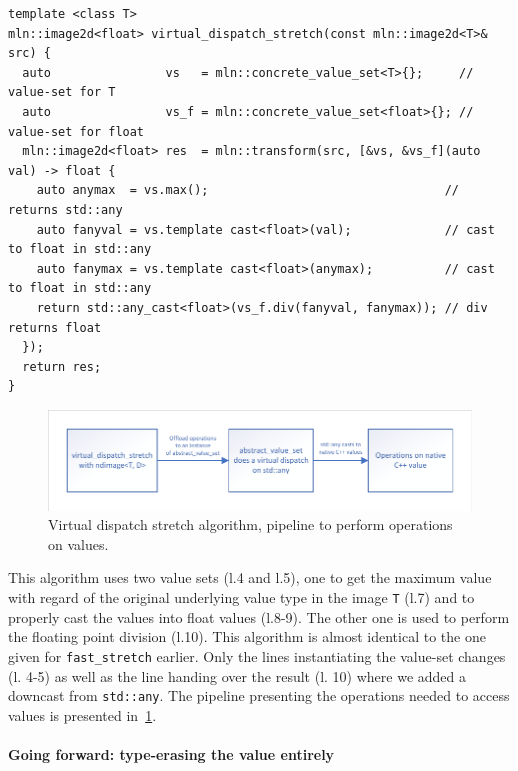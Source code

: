 \begin{verbatim}
template <class T>
mln::image2d<float> virtual_dispatch_stretch(const mln::image2d<T>& src) {
  auto                vs   = mln::concrete_value_set<T>{};     // value-set for T
  auto                vs_f = mln::concrete_value_set<float>{}; // value-set for float
  mln::image2d<float> res  = mln::transform(src, [&vs, &vs_f](auto val) -> float {
    auto anymax  = vs.max();                                 // returns std::any
    auto fanyval = vs.template cast<float>(val);             // cast to float in std::any
    auto fanymax = vs.template cast<float>(anymax);          // cast to float in std::any
    return std::any_cast<float>(vs_f.div(fanyval, fanymax)); // div returns float
  });
  return res;
}
\end{verbatim}

\begin{figure}[htbp]
  \centering
  \includegraphics[width=.8\linewidth]{figs/static_dynamic_bridge/virtual_dispatch_stretch}
  \caption{Virtual dispatch stretch algorithm, pipeline to perform operations on values.}
  \label{fig:static_dyn.virtual_dispatch_stretch}
\end{figure}

This algorithm uses two value sets (l.4 and l.5), one to get the maximum value with regard of the original underlying
value type in the image \texttt{T} (l.7) and to properly cast the values into float values (l.8-9). The other one is
used to perform the floating point division (l.10). This algorithm is almost identical to the one given for
\texttt{fast\_stretch} earlier. Only the lines instantiating the value-set changes (l. 4-5) as well as the line handing
over the result (l. 10) where we added a downcast from \texttt{std::any}. The pipeline presenting the operations needed
to access values is presented in~\cref{fig:static_dyn.virtual_dispatch_stretch}.


\paragraph{Going forward: type-erasing the value entirely}


